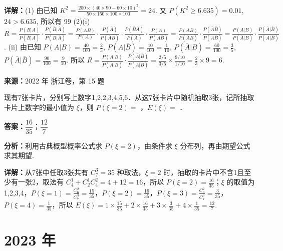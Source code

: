 \begin{question}[points=12]
\begin{solution}
\textbf{详解：}(1) 由已知 $K^2 = \frac{200 \times (40 \times 90 - 60 \times 10)^2}{50 \times 150 \times 100 \times 100} = 24$. 又 $P(K^2 \ge 6.635) = 0.01$, $24 > 6.635$, 所以有 99%
(2)(i) $R = \frac{P(B|A)}{P(\bar{B}|A)} \cdot \frac{P(\bar{B}|\bar{A})}{P(B|\bar{A})} = \frac{P(AB)}{P(A)} \cdot \frac{P(\bar{A})}{P(\bar{A}B)} \cdot \frac{P(\bar{B}\bar{A})}{P(\bar{A})} \cdot \frac{P(A)}{P(A\bar{B})} = \frac{P(AB)}{P(\bar{A}B)} \cdot \frac{P(\bar{A}\bar{B})}{P(A\bar{B})} = \frac{P(A|B)}{P(\bar{A}|B)} \cdot \frac{P(\bar{A}|\bar{B})}{P(A|\bar{B})}$.
(ii) 由已知 $P(A|B) = \frac{40}{100} = \frac{2}{5}$, $P(A|\bar{B}) = \frac{10}{100} = \frac{1}{10}$, $P(\bar{A}|B) = \frac{60}{100} = \frac{3}{5}$, $P(\bar{A}|\bar{B}) = \frac{90}{100} = \frac{9}{10}$. 所以 $R = \frac{P(A|B)}{P(\bar{A}|B)} \cdot \frac{P(\bar{A}|\bar{B})}{P(A|\bar{B})} = \frac{2/5}{3/5} \times \frac{9/10}{1/10} = \frac{2}{3} \times 9 = 6$.
\end{solution}
\end{question}

\begin{question}[points=6]
\textbf{来源：}2022 年 浙江卷，第 15 题\par
现有7张卡片，分别写上数字1,2,2,3,4,5,6．从这7张卡片中随机抽取3张，记所抽取卡片上数字的最小值为 $\xi$，则 $P(\xi=2) =$ ，$E(\xi) =$ ．
\begin{solution}
\textbf{答案：}$\dfrac{16}{35}$；$\dfrac{12}{7}$

\textbf{分析：}利用古典概型概率公式求 $P(\xi=2)$，由条件求 $\xi$ 分布列，再由期望公式求其期望.

\textbf{详解：}从7张中任取3张共有 $C_7^3=35$ 种取法，$\xi=2$ 时，抽取的卡片中不含1且至少有一张2，取法有 $C_4^1 + C_2^1 C_4^2 = 4+12=16$，所以 $P(\xi=2)=\frac{16}{35}$；$\xi$ 的取值为1,2,3,4，$P(\xi=1)=\frac{C_6^2}{C_7^3}=\frac{15}{35}$，$P(\xi=2)=\frac{16}{35}$，$P(\xi=3)=\frac{C_3^2}{C_7^3}=\frac{3}{35}$，$P(\xi=4)=\frac{1}{35}$，所以 $E(\xi)=1\times\frac{15}{35}+2\times\frac{16}{35}+3\times\frac{3}{35}+4\times\frac{1}{35}=\frac{12}{7}$.
\end{solution}
\end{question}

\section*{2023 年}

